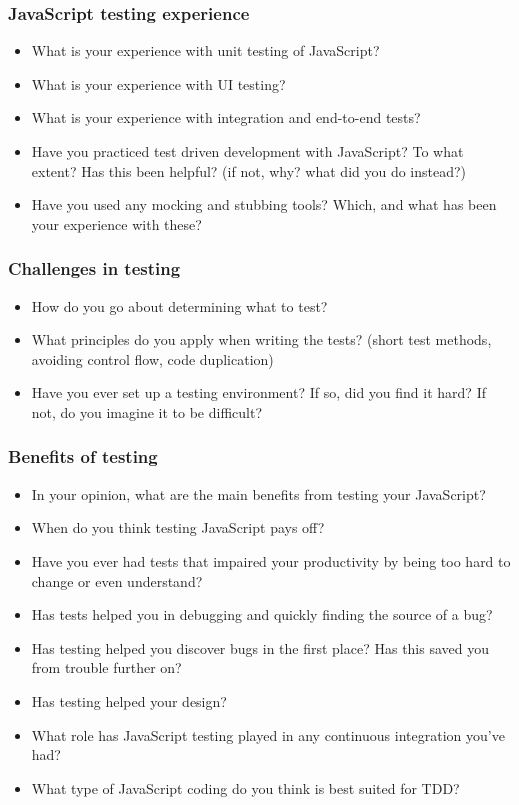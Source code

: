 \documentclass[11pt]{article}
\begin{document}
\subsubsection{JavaScript testing experience}
\begin{itemize}
\item What is your experience with unit testing of JavaScript?
\item What is your experience with UI testing?
\item What is your experience with integration and end-to-end tests?
\item Have you practiced test driven development with JavaScript? To what extent? Has this been helpful? (if not, why? what did you do instead?)
\item Have you used any mocking and stubbing tools? Which, and what has been your experience with these?
\end{itemize}

\subsubsection{Challenges in testing}
\begin{itemize}
\item How do you go about determining what to test?
\item What principles do you apply when writing the tests? (short test methods, avoiding control flow, code duplication)
\item Have you ever set up a testing environment? If so, did you find it hard? If not, do you imagine it to be difficult?
\end{itemize}

\subsubsection{Benefits of testing}
\begin{itemize}
\item In your opinion, what are the main benefits from testing your JavaScript?
\item When do you think testing JavaScript pays off?
\item Have you ever had tests that impaired your productivity by being too hard to change or even understand?
\item Has tests helped you in debugging and quickly finding the source of a bug?
\item Has testing helped you discover bugs in the first place? Has this saved you from trouble further on?
\item Has testing helped your design?
\item What role has JavaScript testing played in any continuous integration you've had?
\item What type of JavaScript coding do you think is best suited for TDD?
\end{itemize}
\end{document}
